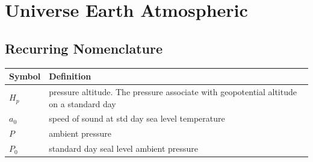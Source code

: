 \documentclass[
]{book}
\begin{document}
\hypertarget{universe-earth-atmospheric}{%
\chapter{Universe Earth Atmospheric}\label{universe-earth-atmospheric}}

\hypertarget{recurring-nomenclature}{%
\section*{Recurring Nomenclature}\label{recurring-nomenclature}}

\begin{longtable}[]{@{}ll@{}}
\toprule
\begin{minipage}[b]{0.21\columnwidth}\raggedright
Symbol\strut
\end{minipage} & \begin{minipage}[b]{0.73\columnwidth}\raggedright
Definition\strut
\end{minipage}\tabularnewline
\midrule
\endhead
\begin{minipage}[t]{0.21\columnwidth}\raggedright
\(H_p\)\strut
\end{minipage} & \begin{minipage}[t]{0.73\columnwidth}\raggedright
pressure altitude. The pressure associate with geopotential altitude on a standard day\strut
\end{minipage}\tabularnewline
\begin{minipage}[t]{0.21\columnwidth}\raggedright
\(a_0\)\strut
\end{minipage} & \begin{minipage}[t]{0.73\columnwidth}\raggedright
speed of sound at std day sea level temperature\strut
\end{minipage}\tabularnewline
\begin{minipage}[t]{0.21\columnwidth}\raggedright
\(P\)\strut
\end{minipage} & \begin{minipage}[t]{0.73\columnwidth}\raggedright
ambient pressure\strut
\end{minipage}\tabularnewline
\begin{minipage}[t]{0.21\columnwidth}\raggedright
\(P_0\)\strut
\end{minipage} & \begin{minipage}[t]{0.73\columnwidth}\raggedright
standard day seal level ambient pressure\strut
\end{minipage}\tabularnewline

\end{longtable}
\end{document}
